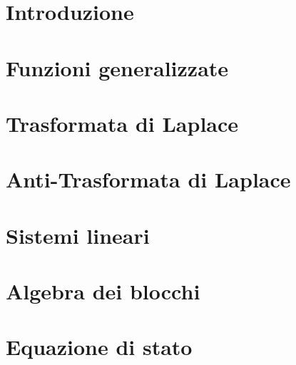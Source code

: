 \documentclass[openright]{report}
\begin{document}
	\dominitoc %
	
	
	
	\titleTdS
	\pagebreak
	\pagebreak
	\tableofcontents
	\pagebreak
	\listofexercises
	\pagebreak
	\chapter{Introduzione}
	\minitoc %
	\pagebreak
		
	\pagebreak
	\chapter{Funzioni generalizzate}
	\minitoc %
	\pagebreak
	
	\pagebreak
	\chapter{Trasformata di Laplace}
	\minitoc %
	\pagebreak
	
	\pagebreak
	\chapter{Anti-Trasformata di Laplace}
	\minitoc %
	\pagebreak
	
	\pagebreak
	\chapter{Sistemi lineari}
	\minitoc %
	\pagebreak
	
	
	
	
	
	\pagebreak
	\chapter{Algebra dei blocchi}
	\minitoc %
	\pagebreak
	
	
	\pagebreak
	\chapter{Equazione di stato}
	\minitoc %
	\pagebreak
	
	\pagebreak
\end{document}
